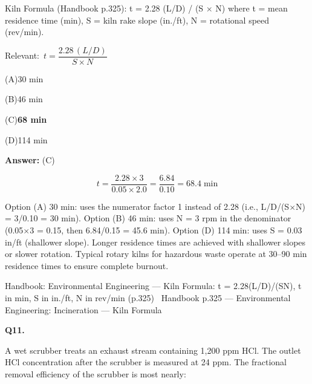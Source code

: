 \documentclass[11pt]{article}
\newcommand{\correct}[1]{\textbf{#1}\;{\color{accent}$\checkmark$}}
\newcommand{\optline}[2]{\par\noindent\hspace{1.2em}(#1)\hspace{0.6em}#2}
\begin{document}
Kiln Formula (Handbook p.325):
t = 2.28 (L/D) / (S $\times$ N)
where t = mean residence time (min), S = kiln rake slope (in./ft), N = rotational speed (rev/min).\par\vspace{3pt}
{\small\color{soft}Relevant:}\ $t = \dfrac{2.28\,(L/D)}{S \times N}$\par\vspace{3pt}
\optline{A}{30 min}
\optline{B}{46 min}
\optline{C}{\correct{68 min}}
\optline{D}{114 min}
\par\vspace{3pt}
\vspace{2pt}\par\noindent\colorbox{boxbg}{\parbox{\dimexpr\linewidth-2\fboxsep\relax}{%
\vspace{2pt}\textbf{Answer:} (C)\par\vspace{2pt}
{\small \[t = \frac{2.28 \times 3}{0.05 \times 2.0} = \frac{6.84}{0.10} = 68.4\;\text{min}\]

Option (A) 30 min: uses the numerator factor 1 instead of 2.28 (i.e., L/D/(S$\times$N) = 3/0.10 = 30 min). Option (B) 46 min: uses N = 3 rpm in the denominator (0.05$\times$3 = 0.15, then 6.84/0.15 = 45.6 min). Option (D) 114 min: uses S = 0.03 in/ft (shallower slope). Longer residence times are achieved with shallower slopes or slower rotation. Typical rotary kilns for hazardous waste operate at 30--90 min residence times to ensure complete burnout.}\par\vspace{2pt}
{\footnotesize\color{soft}Handbook: Environmental Engineering --- Kiln Formula: t = 2.28(L/D)/(SN), t in min, S in in./ft, N in rev/min (p.325) \textbullet\ Handbook p.325 --- Environmental Engineering: Incineration --- Kiln Formula}\vspace{2pt}
}}
\vspace{9pt}
\filbreak
\textbf{\color{accent}Q11.}\par\vspace{2pt}
A wet scrubber treats an exhaust stream containing 1,200 ppm HCl. The outlet HCl concentration after the scrubber is measured at 24 ppm. The fractional removal efficiency of the scrubber is most nearly:
\end{document}
